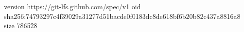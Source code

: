 version https://git-lfs.github.com/spec/v1
oid sha256:74793297c4f39029a31277d51bacde0f0183dc8de618bf6b20b82c437a8816a8
size 786528

